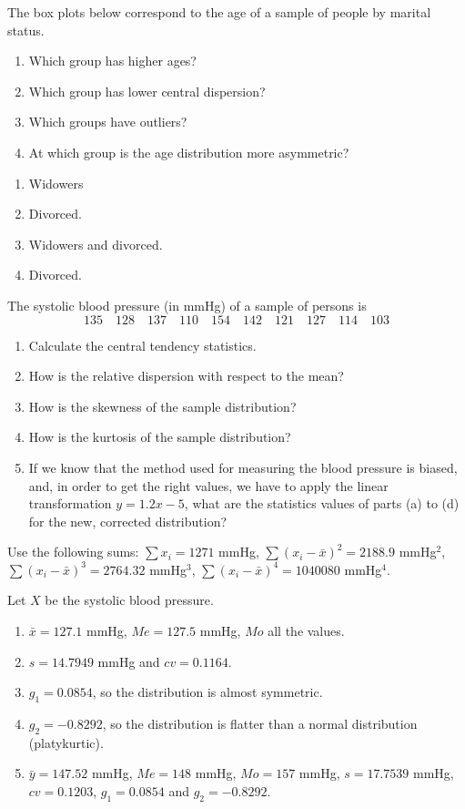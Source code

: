 {The box plots below correspond to the age of a sample of people by marital status.
\begin{center}
\resizebox{0.6\textwidth}{!}{}
\end{center}

\begin{enumerate}
\item Which group has higher ages?
\item Which group has lower central dispersion?
\item Which groups have outliers?
\item At which group is the age distribution more asymmetric?
\end{enumerate}
}
{
\begin{enumerate}
\item Widowers
\item Divorced.
\item Widowers and divorced.
\item Divorced.
\end{enumerate}
}
{
}


{The systolic blood pressure (in mmHg) of a sample of persons is
\[
135\quad 128\quad 137\quad 110\quad 154\quad 142\quad 121\quad 127\quad 114\quad 103
\]

\begin{enumerate}
\item Calculate the central tendency statistics.
\item How is the relative dispersion with respect to the mean?
\item How is the skewness of the sample distribution?
\item How is the kurtosis of the sample distribution?
\item If we know that the method used for measuring the blood pressure is biased, and, in order to get the right values,
we have to apply the linear transformation $y=1.2x-5$, what are the statistics values of parts (a) to (d) for the new, corrected distribution?
\end{enumerate}


Use the following sums: $\sum x_i= 1271$ mmHg, $\sum (x_i-\bar x)^2=2188.9$ mmHg$^2$, $\sum (x_i-\bar x)^3=2764.32$
mmHg$^3$, $\sum (x_i-\bar x)^4=1040080$ mmHg$^4$.
}
{
Let $X$ be the systolic blood pressure.
\begin{enumerate}
\item $\bar{x}=127.1$ mmHg, $Me=127.5$ mmHg, $Mo$ all the values.
\item $s=14.7949$ mmHg and $cv=0.1164$.
\item $g_1=0.0854$, so the distribution is almost symmetric.
\item $g_2=-0.8292$, so the distribution is flatter than a normal distribution (platykurtic).
\item $\bar{y}=147.52$ mmHg, $Me=148$ mmHg, $Mo=157$ mmHg, $s=17.7539$ mmHg, $cv=0.1203$, $g_1=0.0854$ and $g_2=-0.8292$.
\end{enumerate}
}
{
}

